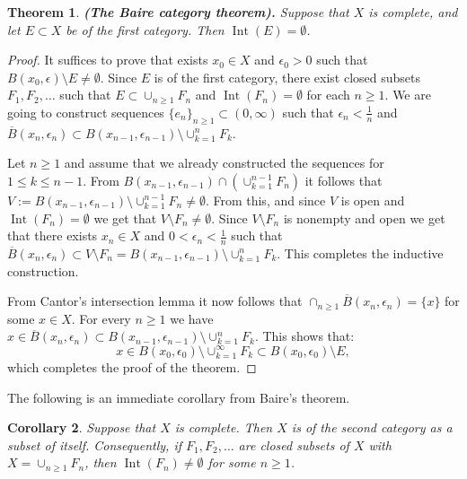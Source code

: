 \documentclass[11pt,a4paper]{article}
\theoremstyle{definition}
\theoremstyle{plain}
\newtheorem{theorem}{Theorem}[section]
\newtheorem{corollary}[theorem]{Corollary}
\DeclareMathOperator{\Int}{Int}
\renewcommand{\tt}[1]{\textnormal{\textbf{(#1).}}} %
\begin{document}
  \begin{theorem}
    \tt{The Baire category theorem}
    Suppose that $X$ is complete, and let $E \subset X$ be of the first
    category. Then $\Int(E) = \emptyset$.
  \end{theorem}
  \begin{proof}
    It suffices to prove that exists $x_0 \in X$ and $\epsilon_0 > 0$ such
    that $B(x_0,\epsilon) \setminus E \neq \emptyset$. Since $E$ is of
    the first category, there exist closed subsets $F_1,F_2,\dots$ such that
    $E \subset \cup_{n \geq 1}{F_n}$ and $\Int(F_n) = \emptyset$ for each
    $n \geq 1$. We are going to construct sequences 
    $\{e_n\}_{n \geq 1} \subset (0,\infty)$ such that 
    $\epsilon_n < \frac{1}{n}$ and $\overline{B}(x_n,\epsilon_n) \subset
    B(x_{n-1},\epsilon_{n-1}) \setminus \cup_{k=1}^{n}{F_k}$. 
    
    Let $n \geq 1$ and assume that we already constructed the sequences
    for $1 \le k \le n-1$. From 
    $B(x_{n-1},\epsilon_{n-1}) \cap (\cup_{k=1}^{n-1}{F_n})$ it follows that 	
    $V:=B(x_{n-1},\epsilon_{n-1}) \setminus \cup_{k=1}^{n-1}{F_n} 
    \neq \emptyset$. From this, and since $V$ is open and 
    $\Int(F_n) = \emptyset$ we get that $V \setminus F_n \neq \emptyset$.
    Since $V \setminus F_n$ is nonempty and open we get that there exists
    $x_n \in X$ and $0 < \epsilon_n < \frac{1}{n}$ such that
    $\overline{B}(x_n,\epsilon_n) \subset V \setminus F_n = 
    B(x_{n-1},\epsilon_{n-1}) \setminus \cup_{k=1}^{n}{F_k}$.
    This completes the inductive construction.
    
    From Cantor's intersection lemma it now follows that
    $\cap_{n \geq 1}{\overline{B}(x_n,\epsilon_n)} = \{x\}$ for some
    $x \in X$. For every $n \geq 1$ we have 
    $x \in \overline{B}(x_n,\epsilon_n) \subset 
    B(x_{n-1},\epsilon_{n-1}) \setminus \cup_{k=1}^{n}{F_k}$. This
    shows that:
    \[
      x \in B(x_{0},\epsilon_{0}) \setminus \cup_{k=1}^{\infty}{F_k}
      \subset B(x_0,\epsilon_0) \setminus E,
    \]
    which completes the proof of the theorem.
  \end{proof}
  
  The following is an immediate corollary from Baire's theorem.
  
  \begin{corollary}
    Suppose that $X$ is complete. Then $X$ is of the second category as a
    subset of itself. Consequently, if $F_1,F_2,\dots$ are closed subsets 
    of $X$ with $X = \cup_{n \geq 1}{F_n}$, then $\Int(F_n) \neq \emptyset$ 
    for some $n \geq 1$.
  \end{corollary}
  
\end{document}
